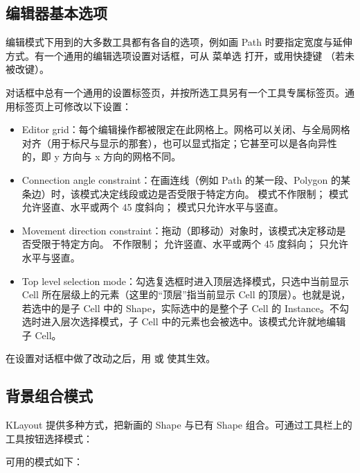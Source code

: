 \subsection{编辑器基本选项}\label{sec:editor_options}

编辑模式下用到的大多数工具都有各自的选项，例如画 Path 时要指定宽度与延伸方式。有一个通用的编辑选项设置对话框，可从  菜单选  打开，或用快捷键 （若未被改键）。

对话框中总有一个通用的设置标签页，并按所选工具另有一个工具专属标签页。通用标签页上可修改以下设置：

\begin{itemize}
\item Editor grid：每个编辑操作都被限定在此网格上。网格可以关闭、与全局网格对齐（用于标尺与显示的那套），也可以显式指定；它甚至可以是各向异性的，即 y 方向与 x 方向的网格不同。
\item Connection angle constraint：在画连线（例如 Path 的某一段、Polygon 的某条边）时，该模式决定线段或边是否受限于特定方向。 模式不作限制； 模式允许竖直、水平或两个 45 度斜向； 模式只允许水平与竖直。
\item Movement direction constraint：拖动（即移动）对象时，该模式决定移动是否受限于特定方向。 不作限制； 允许竖直、水平或两个 45 度斜向； 只允许水平与竖直。
\item Top level selection mode：勾选复选框时进入顶层选择模式，只选中当前显示 Cell 所在层级上的元素（这里的“顶层”指当前显示 Cell 的顶层）。也就是说，若选中的是子 Cell 中的 Shape，实际选中的是整个子 Cell 的 Instance。不勾选时进入层次选择模式，子 Cell 中的元素也会被选中。该模式允许就地编辑子 Cell。
\end{itemize}

在设置对话框中做了改动之后，用  或  使其生效。

\subsection{背景组合模式}\label{sec:background_modes}

KLayout 提供多种方式，把新画的 Shape 与已有 Shape 组合。可通过工具栏上的  工具按钮选择模式：


可用的模式如下：


